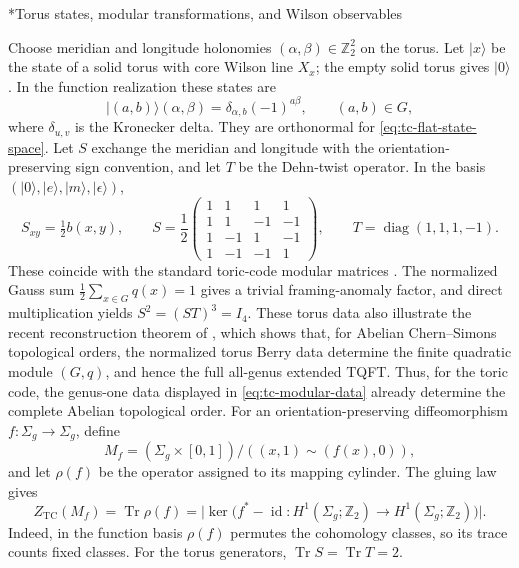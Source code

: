 \documentclass[12pt]{amsart}
\makeatletter
\renewcommand\subsection{\@startsection{subsection}{2}%
  \z@{.5\linespacing\@plus.7\linespacing}{-.5em}%
  {\normalfont\bfseries}}
\numberwithin{equation}{section}
\theoremstyle{definition}
\makeatother
\begin{document}
\subsection*{Torus states, modular transformations, and Wilson observables}

Choose meridian and longitude holonomies
$(\alpha,\beta)\in\mathbb Z_2^2$ on the torus.
Let $|x\rangle$ be the state of a solid torus with core Wilson line
$X_x$; the empty solid torus gives $|0\rangle$.
In the function realization these states are
$$
|(a,b)\rangle(\alpha,\beta)
=
\delta_{\alpha,b}(-1)^{a\beta},
\qquad (a,b)\in G,
$$
where $\delta_{u,v}$ is the Kronecker delta.
They are orthonormal for \eqref{eq:tc-flat-state-space}. Let $S$ exchange the meridian and longitude with the
orientation-preserving sign convention, and let $T$ be the
Dehn-twist operator. In the basis
$(|0\rangle,|e\rangle,|m\rangle,|\epsilon\rangle)$,
\begin{equation}
\label{eq:tc-modular-data}
S_{xy}=\tfrac12 b(x,y),
\qquad
S=\frac12
\begin{pmatrix}
1&1&1&1\\
1&1&-1&-1\\
1&-1&1&-1\\
1&-1&-1&1
\end{pmatrix},
\qquad
T=\operatorname{diag}(1,1,1,-1).
\end{equation}
These coincide with the standard toric-code modular matrices
\cite[Supplemental Material, Section~I]{LanWangWen2015TC}.
The normalized Gauss sum
$\frac12\sum_{x\in G}q(x)=1$ gives a trivial framing-anomaly
factor, and direct multiplication yields
$S^2=(ST)^3=I_4$.  These torus data also illustrate the recent reconstruction theorem of \cite{Galviz7}, which shows that, for Abelian Chern--Simons topological orders, the normalized torus Berry data determine the finite quadratic module $(G,q)$, and hence the full all-genus extended TQFT. Thus, for the toric code, the genus-one data displayed in \eqref{eq:tc-modular-data} already determine the complete Abelian topological order.
For an orientation-preserving diffeomorphism
$f:\Sigma_g\to\Sigma_g$, define
$$
M_f
=
(\Sigma_g\times[0,1])/((x,1)\sim(f(x),0)),
$$
and let $\rho(f)$ be the operator assigned to its mapping cylinder.
The gluing law gives
\begin{equation}
\label{eq:tc-mapping-torus}
Z_{\mathrm{TC}}(M_f)
=
\operatorname{Tr}\rho(f)
=
\bigl|
\ker\bigl(
f^*-\operatorname{id}:
H^1(\Sigma_g;\mathbb Z_2)
\to H^1(\Sigma_g;\mathbb Z_2)
\bigr)
\bigr|.
\end{equation}
Indeed, in the function basis $\rho(f)$ permutes the cohomology
classes, so its trace counts fixed classes.
For the torus generators,
$\operatorname{Tr}S=\operatorname{Tr}T=2$.
\end{document}
